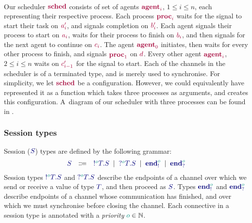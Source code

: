 \documentclass[main.tex]{subfiles}
\begin{document}
\begin{example}
\[\begin{array}{lrlr}
  \end{array}
\]
Our scheduler $\tm{\sched}$ consists of set of agents $\tm{\agent{i}}$, $1\leq{i}\leq{n}$, each representing their respective process. Each process $\tm{\proc{i}}$ waits for the signal to start their task on $\tm{a'_i}$, and signals completion on $\tm{b'_i}$. Each agent signals their process to start on $\tm{a_i}$, waits for their process to finish on $\tm{b_i}$, and then signals for the next agent to continue on $\tm{c_i}$. The agent $\tm{\agent0}$ initiates, then waits for every other process to finish, and signals $\tm{\proc1}$ on $\tm{d}$. Every other agent $\tm{\agent{i}}$, $2\leq{i}\leq{n}$ waits on $\tm{c'_{i-1}}$ for the signal to start.
Each of the channels in the scheduler is of a terminated type, and is merely used to synchronise. For simplicity, we let $\tm{\sched}$ be a configuration. However, we could equivalently have represented it as a function which takes three processes as arguments, and creates this configuration.
A~diagram of our scheduler with three processes can be found in .
\end{example}

\subsubsection*{Session types}
Session ($\ty{S}$) types are defined by the following grammar:
\[
\begin{array}{lcl}
  \ty{S}
  & \Coloneqq & \ty{\tysend[\cs{o}]{T}{S}}
    \sep        \ty{\tyrecv[\cs{o}]{T}{S}}
    \sep        \ty{\tyends[\cs{o}]}
    \sep        \ty{\tyendr[\cs{o}]}
\end{array}
\]
Session types $\ty{\tysend[\cs{o}]{T}{S}}$ and $\ty{\tyrecv[\cs{o}]{T}{S}}$ describe the endpoints of a channel over which we send or receive a value of type $\ty{T}$, and then proceed as $\ty{S}$. Types $\ty{\tyends[\cs{o}]}$ and $\ty{\tyendr[\cs{o}]}$ describe endpoints of a channel whose communication has finished, and over which we must synchronise before closing the channel. Each connective in a session type is annotated with a \emph{priority} $\cs{o}\in\mathbb{N}$.
\end{document}
